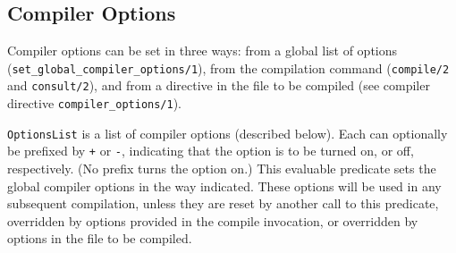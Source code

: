 \subsection{Compiler Options}\label{sec:CompilerOptions}

Compiler options can be set in three ways: from a global list of
options ({\tt set\_global\_compiler\_options/1}), from the
compilation command ({\tt compile/2} and {\tt consult/2}), and
from a directive in the file to be compiled (see compiler directive
{\tt compiler\_options/1}).

\begin{description}
    {\tt OptionsList} is a list of compiler options (described below).
    Each can optionally be prefixed by \verb|+| or \verb|-|,
    indicating that the option is to be turned on, or off,
    respectively.  (No prefix turns the option on.)  This evaluable
    predicate sets the global compiler options in the way indicated.
    These options will be used in any subsequent compilation, unless
    they are 
    reset by another call to this predicate, overridden by options
    provided in the compile invocation, or overridden by options in
    the file to be compiled.
\end{description}

